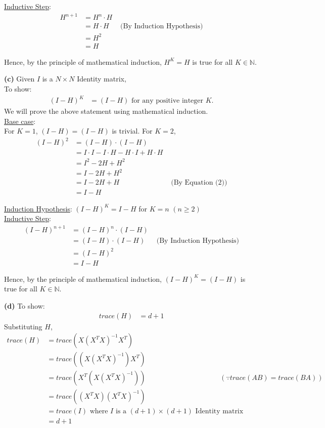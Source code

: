 \documentclass[12pt]{article}
\begin{document}
\uline{Inductive Step}:
\begin{align*}
    H^{n+1} & = H^n\cdot H\\
        & = H\cdot H & \text{ (By Induction Hypothesis)}\\
        & = H^2 \\
        & = H
\end{align*}

Hence, by the principle of mathematical induction, \(H^K = H\) is true for all \(K \in \mathbb{N}\).


\textbf{(c)} Given \(I\) is a \(N\times N\) Identity matrix,\\
To show:
\begin{align}
    (I-H)^K & = (I-H) \text{ for any positive integer \(K\).}
\end{align}
We will prove the above statement using mathematical induction.\\
\uline{Base case}:\\
For \(K = 1\), \((I-H) = (I-H)\) is trivial. For \(K = 2\),
\begin{align*}
    (I-H)^2 & =  (I-H)\cdot (I-H)\\
    & = I\cdot I - I\cdot H - H\cdot I + H\cdot H \\
    & = I^2 - 2H + H^2\\
    & = I - 2H + H^2 \\
    & = I - 2H + H & \text{ (By Equation (2))}\\
    & = I - H
\end{align*}

\uline{Induction Hypothesis}: \((I-H)^K = I-H\) for \(K = n \) \((n\geq 2)\)\\

\uline{Inductive Step}:
\begin{align*}
    (I-H)^{n+1} & = (I-H)^n\cdot (I-H)\\
        & = (I-H)\cdot (I-H) & \text{ (By Induction Hypothesis)}\\
        & = (I-H)^2 \\
        & = I-H
\end{align*}

Hence, by the principle of mathematical induction, \((I-H)^K = (I-H)\) is true for all \(K \in \mathbb{N}\).

\textbf{(d)} To show:
\begin{align}
    trace(H) & = d + 1
\end{align}
Substituting \(H\),
\begin{align*}
    trace(H) & = trace(X(X^TX)^{-1}X^T) \\
    & = trace((X(X^TX)^{-1})X^T) \\
    & = trace(X^T(X(X^TX)^{-1})) & (\because trace(AB) = trace(BA)) \\
    & = trace((X^TX)(X^TX)^{-1}) \\
    & = trace(I) \text{ where \(I\) is a \((d+1)\times (d+1)\) Identity matrix}\\
    & = d+1
\end{align*}
\end{document}
